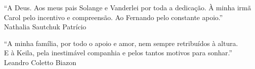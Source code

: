 
  \begin{flushright}

  \vspace*{\fill}

    “A Deus. Aos meus pais Solange e Vanderlei por toda a dedicação. À minha irmã Carol pelo incentivo e compreensão. Ao Fernando pelo constante apoio.” \\ Nathalia Sautchuk Patrício

  \vspace*{\fill}

    “A minha família, por todo o apoio e amor, nem sempre retribuídos à altura.\\E à Keila, pela inestimável companhia e pelos tantos motivos para sonhar.” \\ Leandro Coletto Biazon

  \vspace*{\fill}

  \end{flushright}
